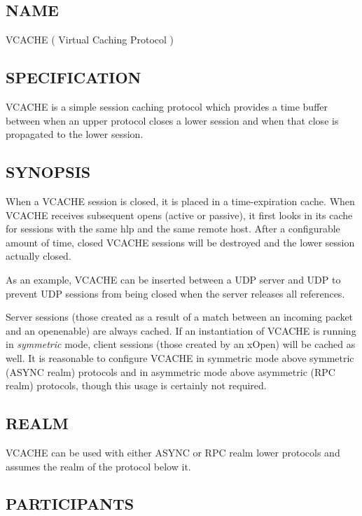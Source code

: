 \subsection*{NAME}

\noindent VCACHE ( Virtual Caching Protocol )


\subsection*{SPECIFICATION}

VCACHE is a simple session caching protocol which provides a time
buffer between when an upper protocol closes a lower session and when
that close is propagated to the lower session.


\subsection*{SYNOPSIS}

When a VCACHE session is closed, it is placed in a time-expiration
cache.  When VCACHE receives subsequent opens (active or passive), it
first looks in its cache for sessions with the same hlp and the same
remote host.  After a configurable amount of time, closed VCACHE
sessions will be destroyed and the lower session actually closed.

As an example, VCACHE can be inserted between a UDP server and UDP to
prevent UDP sessions from being closed when the server releases all
references.

Server sessions (those created as a result of a match between an
incoming packet and an openenable) are always cached.  If an
instantiation of VCACHE is running in {\em symmetric} mode, client
sessions (those created by an xOpen) will be cached as well.  It is
reasonable to configure VCACHE in symmetric mode above symmetric
(ASYNC realm) protocols and in asymmetric mode above asymmetric (RPC
realm) protocols, though this usage is certainly not required.


\subsection*{REALM}

VCACHE can be used with either ASYNC or RPC realm lower protocols and
assumes the realm of the protocol below it.


\subsection*{PARTICIPANTS}

